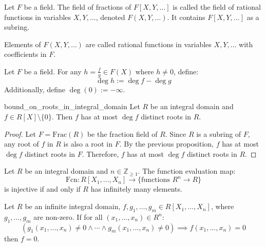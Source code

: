 \begin{definition}
  Let $F$ be a field. The field of fractions of $F[X,Y,\ldots]$ is called the field of rational functions in variables $X,Y,\ldots$, denoted $F(X,Y,\ldots)$. It contains $F[X,Y,\ldots]$ as a subring.

  Elements of $F(X,Y,\ldots)$ are called rational functions in variables $X,Y,\ldots$ with coefficients in $F$.
\end{definition}

\begin{definition}
  Let $F$ be a field. For any $h = \frac{f}{g} \in F(X)$ where $h \neq 0$, define:
  \[
    \deg h := \deg f - \deg g
  \]
  Additionally, define $\deg(0) := -\infty$.
\end{definition}

\begin{corollary}{bound_on_roots_in_integral_domain}
  Let $R$ be an integral domain and $f \in R[X] \setminus \{0\}$. Then $f$ has at most $\deg f$ distinct roots in $R$.
\end{corollary}

\begin{proof}
  Let $F = \text{Frac}(R)$ be the fraction field of $R$.
  Since $R$ is a subring of $F$, any root of $f$ in $R$ is also a root in $F$.
  By the previous proposition, $f$ has at most $\deg f$ distinct roots in $F$.
  Therefore, $f$ has at most $\deg f$ distinct roots in $R$.
\end{proof}

\begin{proposition}
  Let $R$ be an integral domain and $n \in \mathbb{Z}_{\geq 1}$. The function evaluation map:
  \[
    \text{Fcn} : R[X_1,\ldots,X_n] \to \{\text{functions } R^n \to R\}
  \]
  is injective if and only if $R$ has infinitely many elements.
\end{proposition}

\begin{theorem}
  Let $R$ be an infinite integral domain, $f,g_1,\ldots,g_m \in R[X_1,\ldots,X_n]$,
  where $g_1,\ldots,g_m$ are non-zero. If for all $(x_1,\ldots,x_n) \in R^n$:
  \[
    (g_1(x_1,\ldots,x_n) \neq 0 \wedge \cdots \wedge g_m(x_1,\ldots,x_n) \neq 0) \implies f(x_1,\ldots,x_n) = 0
  \]
  then $f = 0$.
\end{theorem}

